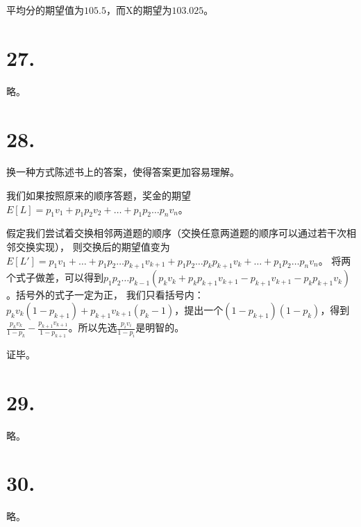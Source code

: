 \documentclass[UTF8]{report}
\begin{document}
            平均分的期望值为$105.5$，而X的期望为$103.025$。
    \section*{27.}
        略。
    \section*{28.}
        换一种方式陈述书上的答案，使得答案更加容易理解。

        我们如果按照原来的顺序答题，奖金的期望$E[L] = p_1v_1 + p_1p_2v_2 + \dots + p_1p_2\dots p_nv_n$。

        假定我们尝试着交换相邻两道题的顺序（交换任意两道题的顺序可以通过若干次相邻交换实现），
        则交换后的期望值变为$E[L'] = p_1v_1 + \dots + p_1p_2\dots p_{k + 1}v_{k + 1} + p_1p_2\dots p_kp_{k + 1}v_k + \dots + p_1p_2\dots p_nv_n$。
        将两个式子做差，可以得到$p_1p_2\dots p_{k - 1}(p_kv_k + p_kp_{k + 1}v_{k + 1} - p_{k + 1}v_{k + 1} - p_kp_{k + 1}v_k)$。括号外的式子一定为正，
        我们只看括号内：$p_kv_k(1 - p_{k + 1}) + p_{k + 1}v_{k + 1}(p_k - 1)$，提出一个$(1 - p_{k + 1})(1 - p_{k})$，得到
        $\frac{p_kv_k}{1 - p_k} - \frac{p_{k + 1}v_{k + 1}}{1 - p_{k + 1}}$。所以先选$\frac{p_iv_i}{1 - p_i}$是明智的。

        证毕。
    \section*{29.}
        略。
    \section*{30.}
        略。
\end{document}

